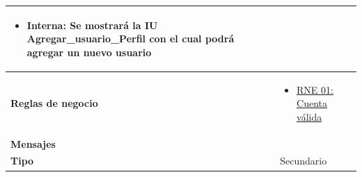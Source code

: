 \begin{center}
\begin{longtable}{| p{3.5cm} | p{11.5cm} |}
		\begin{itemize}
	              \item Interna: Se mostrará la IU Agregar_usuario_Perfil con el cual podrá agregar un nuevo usuario
	            \end{itemize} \\
        \hline
          \textbf{Reglas de negocio} & 
		\begin{itemize}
	         	  \item {\hyperref[rnr_01]{RNE 01: Cuenta válida}}
		 \end{itemize} \\
        \hline
          \textbf{Mensajes} & \\
        \hline
          \textbf{Tipo} & Secundario\\
        \hline      
  \end{longtable}
\end{center}
\endgroup

